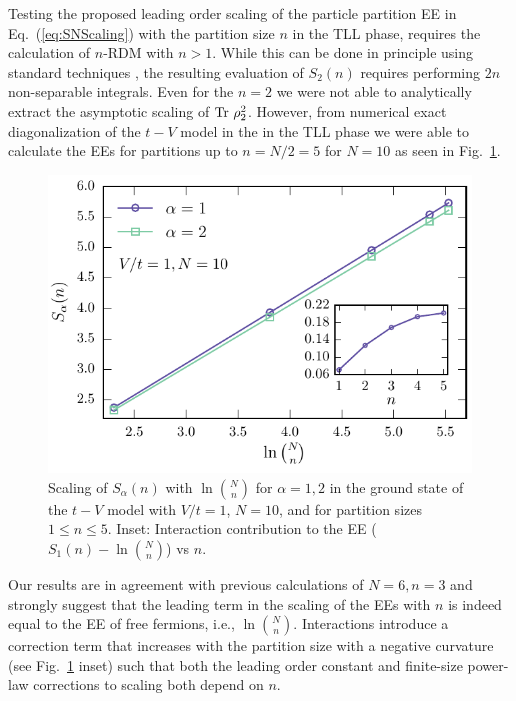 Testing the proposed leading order scaling of the particle partition
EE in Eq.~(\ref{eq:SNScaling}) with the partition size $n$ in the TLL phase,
requires the calculation of $n$-RDM with $n>1$.  While this can be done in
principle using standard techniques \cite{giamarchi:2004qu}, the resulting
evaluation of $S_2(n)$ requires performing $2n$ non-separable integrals.  Even
for the $n=2$ we were not able to analytically extract the asymptotic scaling
of $\rm{Tr}\ \rho_2^2$.  However, from numerical exact diagonalization of the
$t-V$ model in the in the TLL phase we were able to calculate
the \ren EEs for partitions up to $n=N/2=5$ for $N=10$ 
as seen in Fig.~\ref{fig:SvsNchoosen}. 
%
\begin{figure}[h]
\begin{center}
\includegraphics[width=0.7\columnwidth]{Images/ParticleEntanglement/SvsN_choose_N.pdf}
\end{center}
\caption{Scaling of $S_\alpha(n)$ with $\ln \binom{N}{n}$ for $\alpha=1,2$ in
the ground state of the $t-V$ model with $V/t=1$, $N=10$, and for partition
sizes $1 \leq n \leq 5$.  Inset: Interaction  contribution to the EE
($S_1(n)-\ln \binom{N}{n}$) vs $n$.} 
\label{fig:SvsNchoosen}
 \end{figure}
%
Our results are in agreement with previous calculations of $N=6,n=3$
\cite{Zozulya:2008kb} and strongly suggest that the leading term in the scaling
of the \ren EEs with $n$ is indeed equal to the \ren EE of free fermions, i.e.,
$\ln \binom{N}{n}$.  Interactions introduce a correction term that increases
with the partition size with a negative curvature (see Fig.~\ref{fig:SvsNchoosen}
inset) such that both the leading order constant and finite-size power-law
corrections to scaling both depend on $n$.

